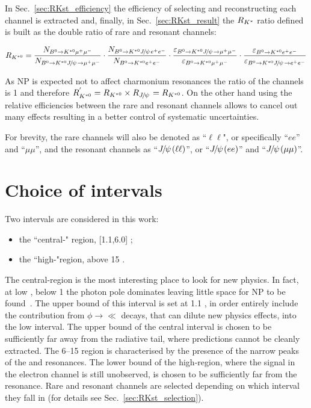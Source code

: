 In Sec.~\ref{sec:RKst_efficiency} the efficiency of selecting and reconstructing each channel is extracted
and, finally, in Sec.~\ref{sec:RKst_result} the $R_{{{K}^*}}$ ratio defined is built as the double ratio
of rare and resonant channels:

\begin{equation}
\label{eq:RKst}
R_{\Kstarz} = 
\frac{N_{\Bz\to\Kstarz \mumu}}{N_{\Bz\to\Kstarz\jpsi\to \mumu}} 
\cdot \frac{N_{\Bz\to\Kstarz \jpsi \ee}}{N_{\Bz\to\Kstarz\ee}}
\cdot \frac{\varepsilon_{\Bz\to\Kstarz \jpsi \to \mumu}}{\varepsilon_{\Bz\to\Kstarz \mumu}} 
\cdot \frac{\varepsilon_{\Bz\to\Kstarz \ee}}{\varepsilon_{\Bz\to\Kstarz\jpsi\to \ee}}
\end{equation}

As NP is expected not to affect charmonium resonances the ratio of the \jpsi channels
is 1 and therefore $R_{\Kstarz}^{'} = R_{\Kstarz} \times R_{\jpsi} = R_{\Kstarz}$.
On the other hand using the relative efficiencies between the rare and resonant channels
allows to cancel out many effects resulting in a better control of systematic uncertainties.  

For brevity, the rare channels will also be denoted as ``$\ell\ell$", or
specifically ``$ee$'' and ``$\mu\mu$'', and the resonant channels as ``$\jpsi(\ell\ell)$'',
or ``$\jpsi(ee)$'' and ``$\jpsi(\mu\mu)$''.

\section{Choice of \qsq intervals}
\label{sec:RKst_q2_choice}

Two \qsq intervals are considered in this work: 
\begin{itemize}
\item the ``central-\qsq" region, [1.1,6.0] \gevgevcccc;
\item the ``high-\qsq "region, above 15 \gevgevcccc.
\end{itemize}
%
The central-\qsq region is the most interesting place to look for new physics. In fact, at low \qsq, below 1 \gevgevcccc
the photon pole dominates leaving little space for NP to be found~\cite{TomRDreview}.
The upper bound of this interval is set at 1.1 \gevgevcccc, in order entirely include the contribution
from $\phi\to\ll$ decays, that can dilute new physics effects, into the low \qsq interval.
The upper bound of the central interval is chosen to be sufficiently far away from the \jpsi radiative
tail, where predictions cannot be cleanly extracted. The 6--15 \gevgevcccc region is characterised by the presence
of the narrow peaks of the \jpsi and \psitwos resonances. The lower bound of the high-\qsq region, where
the signal in the electron channel is still unobserved, is chosen to be sufficiently far from the \psitwos resonance.
Rare and resonant channels are selected depending on which \qsq interval they fall in (for details see Sec.~\ref{sec:RKst_selection}).



